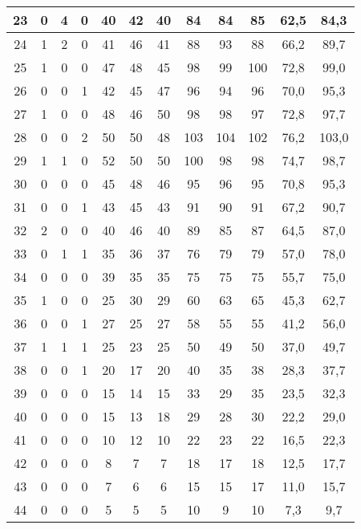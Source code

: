 \begin{center}
\begin{longtable}{|c|c|c|c|c|c|c|c|c|c|c|c|}
		23 & 0 & 4 & 0 & 40 & 42 & 40 & 84  & 84  & 85  & 62,5     & 84,3   \\ \hline
		24 & 1 & 2 & 0 & 41 & 46 & 41 & 88  & 93  & 88  & 66,2     & 89,7   \\ \hline
		25 & 1 & 0 & 0 & 47 & 48 & 45 & 98  & 99  & 100 & 72,8     & 99,0   \\ \hline
		26 & 0 & 0 & 1 & 42 & 45 & 47 & 96  & 94  & 96  & 70,0     & 95,3   \\ \hline
		27 & 1 & 0 & 0 & 48 & 46 & 50 & 98  & 98  & 97  & 72,8     & 97,7   \\ \hline
		28 & 0 & 0 & 2 & 50 & 50 & 48 & 103 & 104 & 102 & 76,2     & 103,0  \\ \hline
		29 & 1 & 1 & 0 & 52 & 50 & 50 & 100 & 98  & 98  & 74,7     & 98,7   \\ \hline
		30 & 0 & 0 & 0 & 45 & 48 & 46 & 95  & 96  & 95  & 70,8     & 95,3   \\ \hline
		31 & 0 & 0 & 1 & 43 & 45 & 43 & 91  & 90  & 91  & 67,2     & 90,7   \\ \hline
		32 & 2 & 0 & 0 & 40 & 46 & 40 & 89  & 85  & 87  & 64,5     & 87,0   \\ \hline
		33 & 0 & 1 & 1 & 35 & 36 & 37 & 76  & 79  & 79  & 57,0     & 78,0   \\ \hline
		34 & 0 & 0 & 0 & 39 & 35 & 35 & 75  & 75  & 75  & 55,7     & 75,0   \\ \hline
		35 & 1 & 0 & 0 & 25 & 30 & 29 & 60  & 63  & 65  & 45,3     & 62,7   \\ \hline
		36 & 0 & 0 & 1 & 27 & 25 & 27 & 58  & 55  & 55  & 41,2     & 56,0   \\ \hline
		37 & 1 & 1 & 1 & 25 & 23 & 25 & 50  & 49  & 50  & 37,0     & 49,7   \\ \hline
		38 & 0 & 0 & 1 & 20 & 17 & 20 & 40  & 35  & 38  & 28,3     & 37,7   \\ \hline
		39 & 0 & 0 & 0 & 15 & 14 & 15 & 33  & 29  & 35  & 23,5     & 32,3   \\ \hline
		40 & 0 & 0 & 0 & 15 & 13 & 18 & 29  & 28  & 30  & 22,2     & 29,0   \\ \hline
		41 & 0 & 0 & 0 & 10 & 12 & 10 & 22  & 23  & 22  & 16,5     & 22,3   \\ \hline
		42 & 0 & 0 & 0 & 8  & 7  & 7  & 18  & 17  & 18  & 12,5     & 17,7   \\ \hline
		43 & 0 & 0 & 0 & 7  & 6  & 6  & 15  & 15  & 17  & 11,0     & 15,7   \\ \hline
		44 & 0 & 0 & 0 & 5  & 5  & 5  & 10  & 9   & 10  & 7,3      & 9,7    \\ \hline

\end{longtable}
\end{center}
